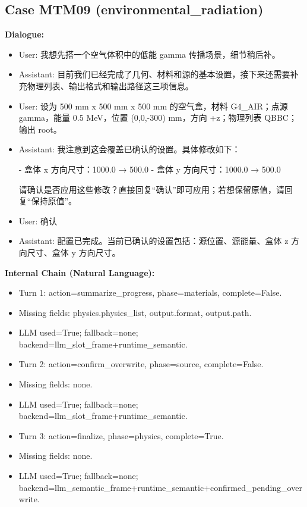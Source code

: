 \documentclass[11pt]{ctexart}
\begin{document}
\subsection{Case MTM09 (environmental\_radiation)}
\textbf{Dialogue:}
\begin{itemize}
\item User: 我想先搭一个空气体积中的低能 gamma 传播场景，细节稍后补。
\item Assistant: 目前我们已经完成了几何、材料和源的基本设置，接下来还需要补充物理列表、输出格式和输出路径这三项信息。
\item User: 设为 500 mm x 500 mm x 500 mm 的空气盒，材料 G4\_AIR；点源 gamma，能量 0.5 MeV，位置 (0,0,-300) mm，方向 +z；物理列表 QBBC；输出 root。
\item Assistant: 我注意到这会覆盖已确认的设置。具体修改如下：

- 盒体 x 方向尺寸：1000.0 → 500.0
- 盒体 y 方向尺寸：1000.0 → 500.0

请确认是否应用这些修改？直接回复“确认”即可应用；若想保留原值，请回复“保持原值”。
\item User: 确认
\item Assistant: 配置已完成。当前已确认的设置包括：源位置、源能量、盒体 z 方向尺寸、盒体 y 方向尺寸。
\end{itemize}
\textbf{Internal Chain (Natural Language):}
\begin{itemize}
\item Turn 1: action=summarize\_progress, phase=materials, complete=False.
\item Missing fields: physics.physics\_list, output.format, output.path.
\item LLM used=True; fallback=none; backend=llm\_slot\_frame+runtime\_semantic.
\item Turn 2: action=confirm\_overwrite, phase=source, complete=False.
\item Missing fields: none.
\item LLM used=True; fallback=none; backend=llm\_slot\_frame+runtime\_semantic.
\item Turn 3: action=finalize, phase=physics, complete=True.
\item Missing fields: none.
\item LLM used=True; fallback=none; backend=llm\_semantic\_frame+runtime\_semantic+confirmed\_pending\_overwrite.
\end{itemize}
\end{document}
